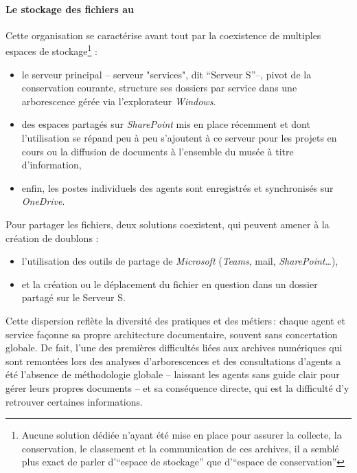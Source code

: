 \paragraph*{Le stockage des fichiers au \mae}
Cette organisation se caractérise avant tout par la coexistence de multiples espaces de stockage\footnote{Aucune solution dédiée n'ayant été mise en place pour assurer la collecte, la conservation, le classement et la communication de ces archives, il a semblé plus exact de parler d'\enquote{espace de stockage} que d'\enquote{espace de conservation}} :

\begin{itemize}
	\item le serveur principal -- serveur "services", dit \enquote{Serveur S}--, pivot de la conservation courante, structure ses dossiers par service dans une arborescence gérée via l’explorateur \textit{Windows}. 
	\item des espaces partagés sur \textit{SharePoint} mis en place récemment et dont l'utilisation se répand peu à peu s'ajoutent à ce serveur pour les projets en cours ou la diffusion de documents à l'ensemble du musée à titre d'information,
	\item enfin, les postes individuels des agents sont enregistrés et synchronisés sur \textit{OneDrive}.
\end{itemize}

Pour partager les fichiers, deux solutions coexistent, qui peuvent amener à la création de doublons :

\begin{itemize}
	\item l'utilisation des outils de partage de \textit{Microsoft} (\textit{Teams}, mail, \textit{SharePoint}\dots),
	\item et la création ou le déplacement du fichier en question dans un dossier partagé sur le Serveur S.
	
\end{itemize}

Cette dispersion reflète la diversité des pratiques et des métiers : chaque agent et service façonne sa propre architecture documentaire, souvent sans concertation globale. De fait, l'une des premières difficultés liées aux archives numériques qui sont remontées lors des analyses d'arborescences et des consultations d'agents a été l'absence de méthodologie globale -- laissant les agents sans guide clair pour gérer leurs propres documents -- et sa conséquence directe, qui est la difficulté d'y retrouver certaines informations.

